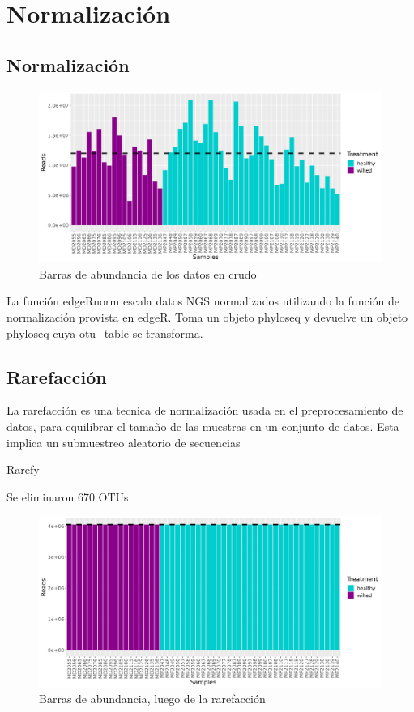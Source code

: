 \section{Normalización}
\subsection{Normalización}

\begin{figure}[!]
\centering
\includegraphics[width=\textwidth]{Img/cap2/Barras_Abundancia.png}
\caption{Barras de abundancia de los datos en crudo}
\end{figure}

La función edgeRnorm escala datos NGS normalizados utilizando la función de normalización provista en edgeR. Toma un objeto phyloseq y devuelve un objeto phyloseq cuya otu\_table se transforma.

\subsection{Rarefacción}
La rarefacción es una tecnica de normalización usada en el preprocesamiento de datos, para equilibrar el tamaño de las muestras en un conjunto de datos. Esta implica un submuestreo aleatorio de secuencias

Rarefy 

Se eliminaron 670 OTUs



\begin{figure}[!]
\centering
\includegraphics[width=\textwidth]{Img/cap2/Rarefaccion.png}
\caption{Barras de abundancia, luego de la rarefacción}
\end{figure}

